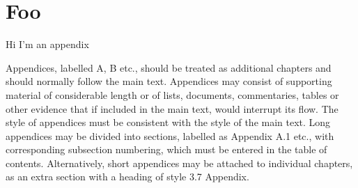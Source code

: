 \documentclass[../HWThesis.tex]{subfiles}
\begin{document}
\chapter{Foo}

Hi I'm an appendix

Appendices, labelled A, B etc., should be treated as additional chapters and should normally follow the main text. Appendices may consist of supporting material of
considerable length or of lists, documents, commentaries, tables or other evidence that if included in the main text, would interrupt its flow. The style of appendices must be consistent with the style of the main text. Long appendices may be divided into sections, labelled as Appendix A.1 etc., with corresponding subsection numbering, which must be entered in the table of contents. Alternatively, short appendices may be attached to individual chapters, as an extra section with a heading of style 3.7 Appendix.
\end{document}
